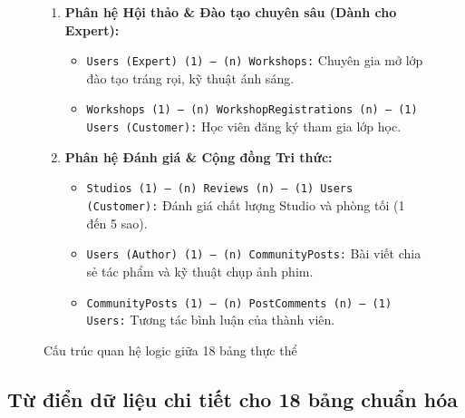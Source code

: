 \begin{figure}[H]
\begin{tcolorbox}[colback=gray!5!white,colframe=gray!75!black,title=\textbf{PHÂN HỆ 18 THỰC THỂ TRONG HỆ THỐNG FILMPHOTOGRAPHYPLATFORM},top=2pt,bottom=2pt]
\begin{enumerate}[leftmargin=1.2em,itemsep=0pt,parsep=0pt,topsep=2pt]
    \begin{itemize}[leftmargin=1em,itemsep=0pt,parsep=0pt]
        \item \texttt{Studios (1) --- (n) Equipment:} Quản lý máy móc thiết bị (\texttt{REUSABLE}) và hóa chất tiêu hao (\texttt{CONSUMABLE}).
        \item \texttt{Equipment (1) --- (n) EquipmentMaintenance:} Nhật ký lịch sử bảo trì, sửa chữa và chi phí.
        \item \texttt{Studios (1) --- (n) ServicePackages:} Các gói dịch vụ định sẵn.
        \item \texttt{ServicePackages (1) --- (n) PackageEquipment (n) --- (1) Equipment:} Thiết bị đi kèm trong gói dịch vụ (quan hệ nhiều-nhiều).
        \item \texttt{Studios (1) --- (n) StudioImages:} Bộ sưu tập hình ảnh cơ sở vật chất của Studio.
    \end{itemize}
    \item \textbf{Phân hệ Hội thảo \& Đào tạo chuyên sâu (Dành cho Expert):}
    \begin{itemize}[leftmargin=1em,itemsep=0pt,parsep=0pt]
        \item \texttt{Users (Expert) (1) --- (n) Workshops:} Chuyên gia mở lớp đào tạo tráng rọi, kỹ thuật ánh sáng.
        \item \texttt{Workshops (1) --- (n) WorkshopRegistrations (n) --- (1) Users (Customer):} Học viên đăng ký tham gia lớp học.
    \end{itemize}
    \item \textbf{Phân hệ Đánh giá \& Cộng đồng Tri thức:}
    \begin{itemize}[leftmargin=1em,itemsep=0pt,parsep=0pt]
        \item \texttt{Studios (1) --- (n) Reviews (n) --- (1) Users (Customer):} Đánh giá chất lượng Studio và phòng tối (1 đến 5 sao).
        \item \texttt{Users (Author) (1) --- (n) CommunityPosts:} Bài viết chia sẻ tác phẩm và kỹ thuật chụp ảnh phim.
        \item \texttt{CommunityPosts (1) --- (n) PostComments (n) --- (1) Users:} Tương tác bình luận của thành viên.
    \end{itemize}
\end{enumerate}
\end{tcolorbox}
\caption{Cấu trúc quan hệ logic giữa 18 bảng thực thể}
\end{figure}

\subsection{Từ điển dữ liệu chi tiết cho 18 bảng chuẩn hóa}

